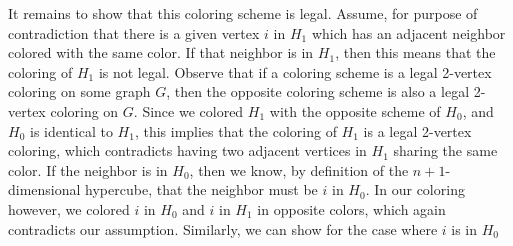 \begin{solution}[3in]
It remains to show that this coloring scheme is legal. Assume, for purpose of contradiction that there is a given 
vertex $i$ in $H_1$ which has an adjacent neighbor colored with the 
same color. If that neighbor is in $H_1$, then this means that the 
coloring of $H_1$ is not legal. Observe that if a coloring scheme is 
a legal 2-vertex coloring on some graph $G$, then the opposite 
coloring scheme is also a legal 2-vertex coloring on $G$. Since we 
colored $H_1$ with the opposite scheme of $H_0$, and $H_0$ is identical 
to $H_1$, this implies that the coloring of $H_1$ is a legal 2-vertex 
coloring, which contradicts having two adjacent vertices in $H_1$ 
sharing the same color. If the neighbor is in $H_0$, then we know, 
by definition of the $n + 1$-dimensional hypercube, that the neighbor 
must be $i$ in $H_0$. In our coloring however, we colored $i$ in $H_0$ 
and $i$ in $H_1$ in opposite colors, which again contradicts our 
assumption. Similarly, we can show for the case where $i$ is in $H_0$
\end{solution}
